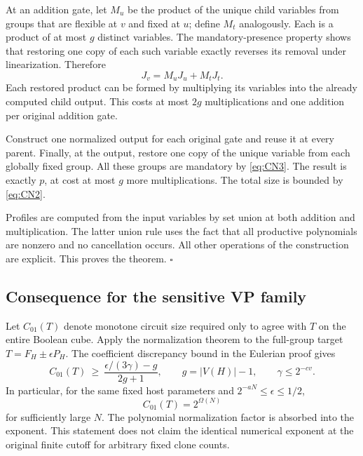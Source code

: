 \documentclass[11pt]{article}
\theoremstyle{definition}
\theoremstyle{remark}
\numberwithin{equation}{section}
\begin{document}
At an addition gate, let \(M_u\) be the product of the unique
child variables from groups that are flexible at \(v\) and
fixed at \(u\); define \(M_t\) analogously. Each is a product
of at most \(g\) distinct variables. The mandatory-presence
property shows that restoring one copy of each such variable
exactly reverses its removal under linearization. Therefore
\begin{equation}\label{eq:CN5}
J_v=M_uJ_u+M_tJ_t.
\end{equation}
Each restored product can be formed by multiplying its
variables into the already computed child output. This costs
at most \(2g\) multiplications and one addition per original
addition gate.

Construct one normalized output for each original gate and
reuse it at every parent. Finally, at the output, restore
one copy of the unique variable from each globally fixed
group. All these groups are mandatory by \eqref{eq:CN3}. The result
is exactly \(p\), at cost at most \(g\) more multiplications.
The total size is bounded by \eqref{eq:CN2}.

Profiles are computed from the input variables by set union
at both addition and multiplication. The latter union rule
uses the fact that all productive polynomials are nonzero
and no cancellation occurs. All other operations of the
construction are explicit. This proves the theorem.
\(\square\)

\subsection{Consequence for the sensitive VP family}

Let \(C_{01}(T)\) denote monotone circuit size required only
to agree with \(T\) on the entire Boolean cube. Apply the
normalization theorem to the full-group target
\(T=F_H\pm\epsilon P_H\). The coefficient discrepancy bound
in the Eulerian proof gives
\begin{equation}\label{eq:CN6}
C_{01}(T)\ \ge\
 \frac{\epsilon/(3\gamma)-g}{2g+1},\qquad
 g=|V(H)|-1,\qquad \gamma\le2^{-cv}.
\end{equation}
In particular, for the same fixed host parameters and
\(2^{-aN}\le\epsilon\le1/2\),
\begin{equation}\label{eq:CN7}
C_{01}(T)=2^{\Omega(N)}
\end{equation}
for sufficiently large \(N\). The polynomial normalization
factor is absorbed into the exponent. This statement does
not claim the identical numerical exponent at the original
finite cutoff for arbitrary fixed clone counts.
\end{document}
